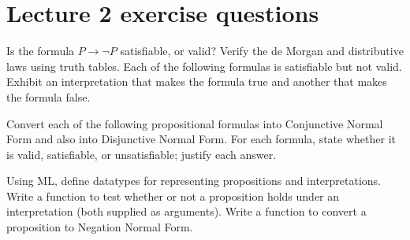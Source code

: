 \documentclass{supervision}
\begin{document}
  \section*{Lecture 2 exercise questions}
  \begin{questions}
    \question Is the formula $P \to \lnot P$ satisfiable, or valid?
    \question Verify the de Morgan and distributive laws using truth tables.
    \question Each of the following formulas is satisfiable but not valid.
      Exhibit an interpretation that makes the formula true and another that
      makes the formula false.
    \question Convert each of the following propositional formulas into
      Conjunctive Normal Form and also into Disjunctive Normal Form. For each
      formula, state whether it is valid, satisfiable, or unsatisfiable;
      justify each answer.
    \question Using ML, define datatypes for representing propositions and
      interpretations. Write a function to test whether or not a proposition
      holds under an interpretation (both supplied as arguments). Write a
      function to convert a proposition to Negation Normal Form.
  \end{questions}
\end{document}
